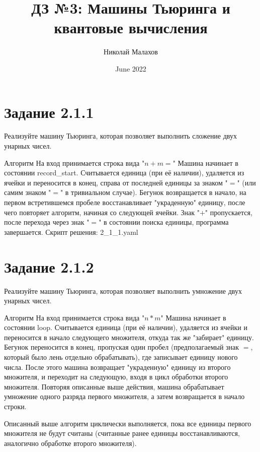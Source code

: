 \documentclass{article}
\title{ДЗ №3: Машины Тьюринга и квантовые вычисления}
\author{Николай Малахов}
\date{June 2022}
\begin{document}
\maketitle

\section{Задание 2.1.1}
Реализуйте машину Тьюринга, которая позволяет выполнить сложение двух унарных чисел.\newline

Алгоритм\newline
На вход принимается строка вида "$n+m=$"\newline
Машина начинает в состоянии record\_start. Считывается единица (при её наличии), удаляется из ячейки и переносится в конец, справа от последней единицы за знаком "$=$" (или самим знаком "$=$" в тривиальном случае). Бегунок возвращается в начало, на первом встретившемся пробеле восстанавливает "украденную" единицу, после чего повторяет алгоритм, начиная со следующей ячейки.\newline
Знак "$+$" пропускается, после перехода через знак "$=$" в состоянии поиска единицы, программа завершается.\newline
Скрипт решения: 2\_1\_1.yaml\newline


\section{Задание 2.1.2}
Реализуйте машину Тьюринга, которая позволяет выполнить умножение двух унарных чисел.\newline

Алгоритм\newline
На вход принимается строка вида "$n*m$"\newline
Машина начинает в состоянии loop. Считывается единица (при её наличии), удаляется из ячейки и переносится в начало следующего множителя, откуда так же "забирает" единицу.
Бегунок переносится в конец, пропуская один пробел (предполагаемый знак $=$, который было лень отдельно обрабатывать), где записывает единицу нового числа.
После этого машина возвращает "украденную"  единицу из второго множителя, и переходит на следующую, входя в цикл обработки второго множителя. 
Повторяя описанные выше действия, машина обрабатывает умножение одного разряда первого множителя, а затем возвращается в начало строки.

Описанный выше алгоритм циклически выполняется, пока все единицы первого множителя не будут считаны (считанные ранее единицы восстанавливаются, аналогично обработке второго множителя).
\end{document}
